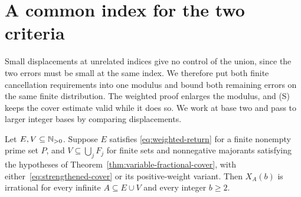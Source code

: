 \documentclass[11pt]{article}
\begin{document}
\section{A common index for the two criteria}\label{sec:mixed}
Small displacements at unrelated indices give no control of the union,
since the two errors must be small at the same index. We therefore put
both finite cancellation requirements into one modulus and bound both
remaining errors on the same finite distribution. The weighted proof
enlarges the modulus, and (S) keeps the cover estimate valid while it
does so. We work at base two and pass to larger integer bases by
comparing displacements.
\begin{samepage}
\begin{theorem}\label{res:mixed-supports}
Let $E,V\subseteq\mathbb{N}_{>0}$.  Suppose $E$ satisfies
\eqref{eq:weighted-return} for a finite nonempty prime set $P$, and
$V\subseteq\bigcup_jF_j$ for finite sets and nonnegative majorants
satisfying the hypotheses of Theorem~\ref{thm:variable-fractional-cover},
with either~\eqref{eq:strengthened-cover} or its positive-weight variant.
Then $X_A(b)$ is irrational for every
infinite $A\subseteq E\cup V$ and every integer $b\ge2$.
\end{theorem}
\end{samepage}
\end{document}
